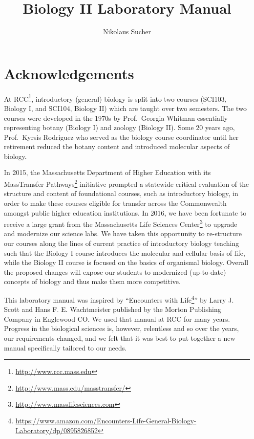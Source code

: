 \documentclass[]{book}
\title{Biology II Laboratory Manual}
\author{Nikolaus Sucher}
\date{}
\let\rmarkdownfootnote\footnote%
\def\footnote{\protect\rmarkdownfootnote}
\renewcommand{\href}[2]{#2\footnote{\url{#1}}}
\theoremstyle{definition}
\theoremstyle{definition}
\theoremstyle{definition}
\theoremstyle{remark}
\begin{document}
\maketitle

{
\setcounter{tocdepth}{1}
\tableofcontents
}
\listoftables
\listoffigures

\chapter*{Acknowledgements}\label{acknowledgements}

At \href{http://www.rcc.mass.edu}{RCC}, introductory (general) biology
is split into two courses (SCI103, Biology I, and SCI104, Biology II)
which are taught over two semesters. The two courses were developed in
the 1970s by Prof.~Georgia Whitman essentially representing botany
(Biology I) and zoology (Biology II). Some 20 years ago, Prof.~Kyrsis
Rodriguez who served as the biology course coordinator until her
retirement reduced the botany content and introduced molecular aspects
of biology.

In 2015, the Massachusetts Department of Higher Education with its
\href{http://www.mass.edu/masstransfer/}{MassTransfer Pathways}
initiative prompted a statewide critical evaluation of the structure and
content of foundational courses, such as introductory biology, in order
to make these courses eligible for transfer across the Commonwealth
amongst public higher education institutions. In 2016, we have been
fortunate to receive a large grant from the
\href{http://www.masslifesciences.com}{Massachusetts Life Sciences
Center} to upgrade and modernize our science labs. We have taken this
opportunity to re-structure our courses along the lines of current
practice of introductory biology teaching such that the Biology I course
introduces the molecular and cellular basis of life, while the Biology
II course is focused on the basics of organismal biology. Overall the
proposed changes will expose our students to modernized (up-to-date)
concepts of biology and thus make them more competitive.

This laboratory manual was inspired by
``\href{https://www.amazon.com/Encounters-Life-General-Biology-Laboratory/dp/0895826852}{Encounters
with Life}'' by Larry J. Scott and Hans F. E. Wachtmeister published by
the Morton Publishing Company in Englewood CO. We used that manual at
RCC for many years. Progress in the biological sciences is, however,
relentless and so over the years, our requirements changed, and we felt
that it was best to put together a new manual specifically tailored to
our needs.
\end{document}
